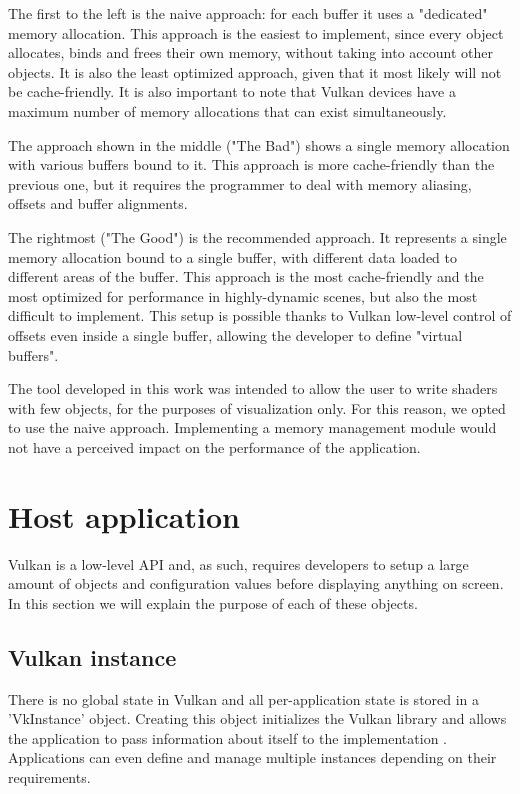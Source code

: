 The first to the left is the naive approach: for each buffer it uses a "dedicated" memory allocation. This approach is the easiest to implement, since every object allocates, binds and frees their own memory, without taking into account other objects. It is also the least optimized approach, given that it most likely will not be cache-friendly. It is also important to note that Vulkan devices have a maximum number of memory allocations that can exist simultaneously.

The approach shown in the middle ("The Bad") shows a single memory allocation with various buffers bound to it. This approach is more cache-friendly than the previous one, but it requires the programmer to deal with memory aliasing, offsets and buffer alignments.

The rightmost ("The Good") is the recommended approach. It represents a single memory allocation bound to a single buffer, with different data loaded to different areas of the buffer. This approach is the most cache-friendly and the most optimized for performance in highly-dynamic scenes, but also the most difficult to implement. This setup is possible thanks to Vulkan low-level control of offsets even inside a single buffer, allowing the developer to define "virtual buffers".

The tool developed in this work was intended to allow the user to write shaders with few objects, for the purposes of visualization only. For this reason, we opted to use the naive approach. Implementing a memory management module would not have a perceived impact on the performance of the application.

\section{Host application}
Vulkan is a low-level API and, as such, requires developers to setup a large amount of objects and configuration values before displaying anything on screen. In this section we will explain the purpose of each of these objects.

\subsection{Vulkan instance}
There is no global state in Vulkan and all per-application state is stored in a 'VkInstance' object. Creating this object initializes the Vulkan library and allows the application to pass information about itself to the implementation \cite{vulkan_docs}. Applications can even define and manage multiple instances depending on their requirements.

